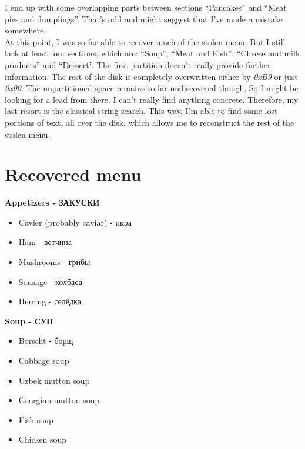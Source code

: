 \documentclass[
	12pt, %
]{fphw}
\begin{document}
I end up with some overlapping parts between sections “Pancakes” and “Meat pies and dumplings”.
That’s odd and might suggest that I’ve made a mistake somewhere.\\

At this point, I was so far able to recover much of the stolen menu. But I still lack at least four
sections, which are: “Soup”, “Meat and Fish”, “Cheese and milk products” and “Dessert”. The first
partition doesn’t really provide further information. The rest of the disk is completely overwritten
either by \textit{0xB9} or just \textit{0x00}. The unpartitioned space remains so far undiscovered though. So I might be looking for a lead from there. I can’t really find anything concrete. Therefore, my last resort is the
classical string search. This way, I’m able to find some lost portions of text, all over the disk, which
allows me to reconstruct the rest of the stolen menu.

\section{Recovered menu}
\label{sec:doc2}

\textbf{Appetizers - \foreignlanguage{russian}{ЗАКУСКИ}}

\begin{itemize}
	\item Cavier (probably caviar) - \foreignlanguage{russian}{икра}
	\item Ham - \foreignlanguage{russian}{ветчина}
	\item Mushrooms - \foreignlanguage{russian}{грибы}
	\item Sausage - \foreignlanguage{russian}{колбаса}
	\item Herring - \foreignlanguage{russian}{селёдка}
\end{itemize}

\textbf{Soup - \foreignlanguage{russian}{СУП}}

\begin{itemize}
	\item Borscht - \foreignlanguage{russian}{борщ}
	\item Cabbage soup
	\item Uzbek mutton soup
	\item Georgian mutton soup
	\item Fish soup
	\item Chicken soup
\end{itemize}
\end{document}
